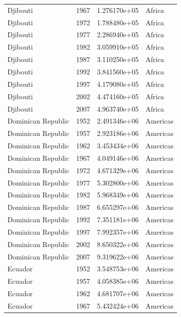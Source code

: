 \documentclass[
  letterpaper,
  DIV=11,
  numbers=noendperiod]{scrreprt}
\begin{document}
\begin{tcolorbox}
\begin{tabular}{lrrl}
Djibouti                 &  1967 &  1.276170e+05 &    Africa \\
Djibouti                 &  1972 &  1.788480e+05 &    Africa \\
Djibouti                 &  1977 &  2.286940e+05 &    Africa \\
Djibouti                 &  1982 &  3.059910e+05 &    Africa \\
Djibouti                 &  1987 &  3.110250e+05 &    Africa \\
Djibouti                 &  1992 &  3.841560e+05 &    Africa \\
Djibouti                 &  1997 &  4.179080e+05 &    Africa \\
Djibouti                 &  2002 &  4.474160e+05 &    Africa \\
Djibouti                 &  2007 &  4.963740e+05 &    Africa \\
Dominican Republic       &  1952 &  2.491346e+06 &  Americas \\
Dominican Republic       &  1957 &  2.923186e+06 &  Americas \\
Dominican Republic       &  1962 &  3.453434e+06 &  Americas \\
Dominican Republic       &  1967 &  4.049146e+06 &  Americas \\
Dominican Republic       &  1972 &  4.671329e+06 &  Americas \\
Dominican Republic       &  1977 &  5.302800e+06 &  Americas \\
Dominican Republic       &  1982 &  5.968349e+06 &  Americas \\
Dominican Republic       &  1987 &  6.655297e+06 &  Americas \\
Dominican Republic       &  1992 &  7.351181e+06 &  Americas \\
Dominican Republic       &  1997 &  7.992357e+06 &  Americas \\
Dominican Republic       &  2002 &  8.650322e+06 &  Americas \\
Dominican Republic       &  2007 &  9.319622e+06 &  Americas \\
Ecuador                  &  1952 &  3.548753e+06 &  Americas \\
Ecuador                  &  1957 &  4.058385e+06 &  Americas \\
Ecuador                  &  1962 &  4.681707e+06 &  Americas \\
Ecuador                  &  1967 &  5.432424e+06 &  Americas \\

\end{tabular}
\end{tcolorbox}
\end{document}
